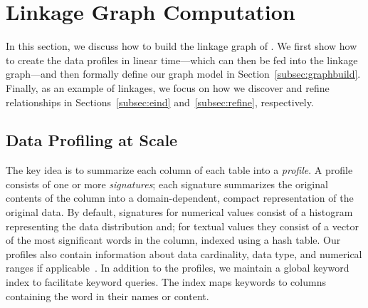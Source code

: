 \section{Linkage Graph Computation}
\label{sec:stitching}

In this section, we discuss how to build the linkage graph of \dcv. We first
show how to create the data profiles in linear time---which can then be fed into
the linkage graph---and then formally define our graph model in
Section~\ref{subsec:graphbuild}. Finally, as an example of linkages, we focus on
how we discover and refine \pkfk relationships in Sections~\ref{subsec:eind}
and~\ref{subsec:refine}, respectively.



\subsection{Data Profiling at Scale}\label{subsec:profile}

The key idea is to summarize each column of each table into a {\em profile}.
A profile consists of one or more {\it signatures};  each signature summarizes
the original contents of the column into a domain-dependent, compact
representation of the original data.  By default, signatures for numerical values consist of a
histogram representing the data distribution and; for textual values they consist of a vector
of the most significant words in the column, indexed using a hash table.  Our profiles also
contain information about data cardinality, data type, and numerical ranges if
applicable~\cite{profiling_survey}. In addition to the profiles, we maintain a
global keyword index to facilitate keyword queries. The index maps keywords to
columns containing the word in their names or content.


